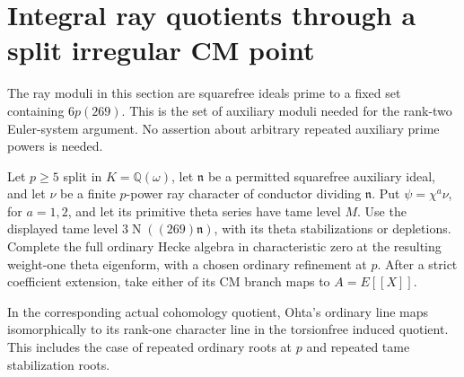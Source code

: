 \section{Integral ray quotients through a split irregular CM point}
\label{sec:cubic-irregular-ray}

The ray moduli in this section are squarefree ideals prime to a fixed
set containing \(6p(269)\).  This is the set of auxiliary moduli
needed for the rank-two Euler-system argument.  No assertion about
arbitrary repeated auxiliary prime powers is needed.

\begin{lemma}
\label{AC-K29-irregular-old}
Let \(p\geq5\) split in \(K=\mathbb Q(\omega)\), let
\(\mathfrak n\) be a permitted squarefree auxiliary ideal,
and let \(\nu\) be a finite \(p\)-power ray character of conductor
dividing \(\mathfrak n\).  Put \(\psi=\chi^a\nu\), for
\(a=1,2\), and let its primitive theta series have tame level
\(M\).  Use the displayed tame level
\(3\operatorname N((269)\mathfrak n)\), with its theta
stabilizations or depletions.  Complete the full ordinary Hecke algebra in
characteristic zero at the resulting weight-one theta eigenform,
with a chosen ordinary refinement at \(p\).  After a strict
coefficient extension, take either of its CM branch maps to
\(A=E[[X]]\).

In the corresponding actual cohomology quotient, Ohta's ordinary
line maps isomorphically to its rank-one character line in the
torsionfree induced quotient.  This includes the case of repeated
ordinary roots at \(p\) and repeated tame stabilization roots.
\end{lemma}


